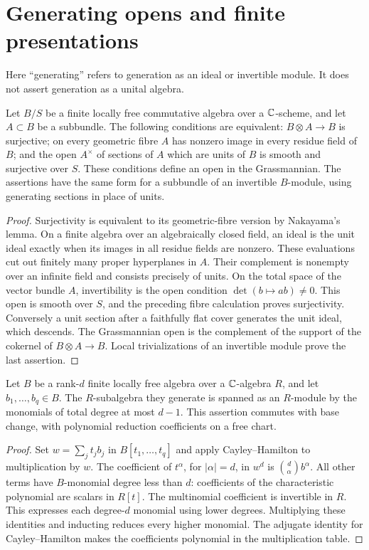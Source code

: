 \section{Generating opens and finite presentations}
\label{sec:finite-preliminaries}
Here ``generating'' refers to generation as an ideal or invertible
module. It does not assert generation as a unital algebra.

\begin{lemma}\label{lem:generating-open}
Let $B/S$ be a finite locally free commutative algebra over a
$\mathbb C$-scheme, and let $A\subset B$ be a subbundle. The following
conditions are equivalent: $B\otimes A\to B$ is surjective; on every
geometric fibre $A$ has nonzero image in every residue field of $B$;
and the open $A^\times$ of sections of $A$ which are units of $B$
is smooth and surjective over $S$. These conditions define an open
in the Grassmannian. The assertions have the same form for a
subbundle of an invertible $B$-module, using generating sections in
place of units.
\end{lemma}
\begin{proof}
Surjectivity is equivalent to its geometric-fibre version by
Nakayama's lemma. On a finite algebra over an algebraically closed
field, an ideal is the unit ideal exactly when its images in all
residue fields are nonzero. These evaluations cut out finitely many
proper hyperplanes in $A$. Their complement is nonempty over an
infinite field and consists precisely of units. On the total space
of the vector bundle $A$, invertibility is the open condition
$\det(b\mapsto ab)\ne0$. This open is smooth over $S$, and the
preceding fibre calculation proves surjectivity. Conversely a unit
section after a faithfully flat cover generates the unit ideal,
which descends. The Grassmannian open is the complement of the
support of the cokernel of $B\otimes A\to B$. Local trivializations
of an invertible module prove the last assertion.
\end{proof}

\begin{lemma}\label{lem:polarized-truncation}
Let $B$ be a rank-$d$ finite locally free algebra over a $\mathbb C$-algebra
$R$, and let $b_1,\ldots,b_q\in B$. The $R$-subalgebra they generate
is spanned as an $R$-module by the monomials of total degree at most
$d-1$. This assertion commutes with base change, with polynomial
reduction coefficients on a free chart.
\end{lemma}
\begin{proof}
Set $w=\sum_j t_jb_j$ in $B[t_1,\ldots,t_q]$ and apply
Cayley--Hamilton to multiplication by $w$. The coefficient of
$t^\alpha$, for $|\alpha|=d$, in $w^d$ is
$\binom d\alpha b^\alpha$. All other terms have $B$-monomial degree
less than $d$: coefficients of the characteristic polynomial are
scalars in $R[t]$. The multinomial coefficient is invertible in $R$.
This expresses each degree-$d$ monomial using lower degrees.
Multiplying these identities and inducting reduces every higher
monomial. The adjugate identity for Cayley--Hamilton makes the
coefficients polynomial in the multiplication table.
\end{proof}
